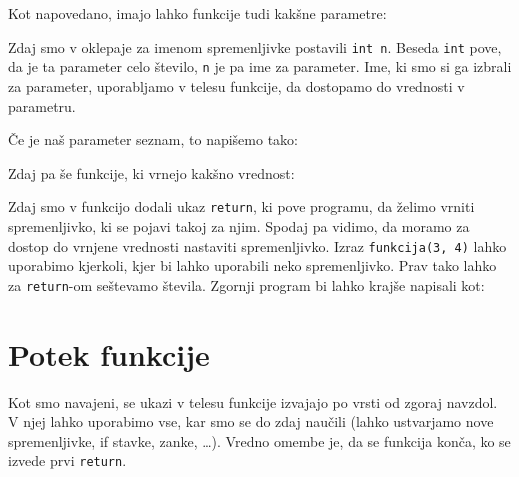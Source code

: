 \documentclass{book}
\begin{document}
Kot napovedano, imajo lahko funkcije tudi kakšne parametre:

\begin{examples}
\end{examples}

Zdaj smo v oklepaje za imenom spremenljivke postavili \verb+int n+. Beseda
\verb+int+ pove, da je ta parameter celo število, \verb+n+ je pa ime za
parameter. Ime, ki smo si ga izbrali za parameter, uporabljamo v telesu
funkcije, da dostopamo do vrednosti v parametru.

Če je naš parameter seznam, to napišemo tako:

\begin{examples}
\end{examples}

Zdaj pa še funkcije, ki vrnejo kakšno vrednost:

\begin{examples}
\end{examples}

Zdaj smo v funkcijo dodali ukaz \verb+return+, ki pove programu, da želimo
vrniti spremenljivko, ki se pojavi takoj za njim. Spodaj pa vidimo, da moramo
za dostop do vrnjene vrednosti nastaviti spremenljivko. Izraz
\verb+funkcija(3, 4)+ lahko uporabimo kjerkoli, kjer bi lahko uporabili neko
spremenljivko. Prav tako lahko za \verb+return+-om seštevamo števila. Zgornji
program bi lahko krajše napisali kot:

\begin{examples}
\end{examples}


\section{Potek funkcije}

Kot smo navajeni, se ukazi v telesu funkcije izvajajo po vrsti od zgoraj
navzdol. V njej lahko uporabimo vse, kar smo se do zdaj naučili (lahko
ustvarjamo nove spremenljivke, if stavke, zanke, \ldots ). Vredno omembe je, da
se funkcija konča, ko se izvede prvi \verb+return+.

\begin{examples}
\end{examples}
\end{document}
